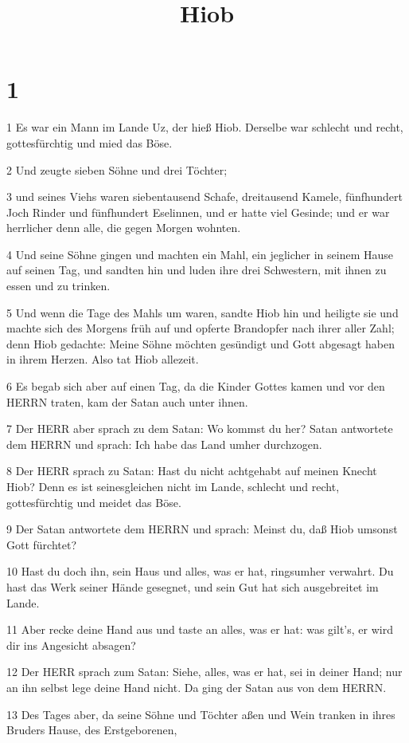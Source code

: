 

\title{Hiob}


\chapter{1}

\par 1 Es war ein Mann im Lande Uz, der hieß Hiob. Derselbe war schlecht und recht, gottesfürchtig und mied das Böse.
\par 2 Und zeugte sieben Söhne und drei Töchter;
\par 3 und seines Viehs waren siebentausend Schafe, dreitausend Kamele, fünfhundert Joch Rinder und fünfhundert Eselinnen, und er hatte viel Gesinde; und er war herrlicher denn alle, die gegen Morgen wohnten.
\par 4 Und seine Söhne gingen und machten ein Mahl, ein jeglicher in seinem Hause auf seinen Tag, und sandten hin und luden ihre drei Schwestern, mit ihnen zu essen und zu trinken.
\par 5 Und wenn die Tage des Mahls um waren, sandte Hiob hin und heiligte sie und machte sich des Morgens früh auf und opferte Brandopfer nach ihrer aller Zahl; denn Hiob gedachte: Meine Söhne möchten gesündigt und Gott abgesagt haben in ihrem Herzen. Also tat Hiob allezeit.
\par 6 Es begab sich aber auf einen Tag, da die Kinder Gottes kamen und vor den HERRN traten, kam der Satan auch unter ihnen.
\par 7 Der HERR aber sprach zu dem Satan: Wo kommst du her? Satan antwortete dem HERRN und sprach: Ich habe das Land umher durchzogen.
\par 8 Der HERR sprach zu Satan: Hast du nicht achtgehabt auf meinen Knecht Hiob? Denn es ist seinesgleichen nicht im Lande, schlecht und recht, gottesfürchtig und meidet das Böse.
\par 9 Der Satan antwortete dem HERRN und sprach: Meinst du, daß Hiob umsonst Gott fürchtet?
\par 10 Hast du doch ihn, sein Haus und alles, was er hat, ringsumher verwahrt. Du hast das Werk seiner Hände gesegnet, und sein Gut hat sich ausgebreitet im Lande.
\par 11 Aber recke deine Hand aus und taste an alles, was er hat: was gilt's, er wird dir ins Angesicht absagen?
\par 12 Der HERR sprach zum Satan: Siehe, alles, was er hat, sei in deiner Hand; nur an ihn selbst lege deine Hand nicht. Da ging der Satan aus von dem HERRN.
\par 13 Des Tages aber, da seine Söhne und Töchter aßen und Wein tranken in ihres Bruders Hause, des Erstgeborenen,
